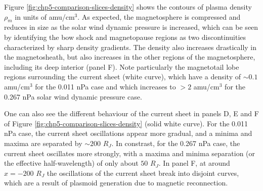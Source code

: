Figure \ref{fig:chp5-comparison-slices-density} shows the contours of plasma density $\rho_m$ in units of amu/cm$^3$. As expected, the magnetosphere is compressed and reduces in size as the solar wind dynamic pressure is increased, which can be seen by identifying the bow shock and magnetopause regions as two discontinuities characterized by sharp density gradients. The density also increases drastically in the magnetosheath, but also increases in the other regions of the magnetosphere, including its deep interior (panel F). Note particularly the magnetotail lobe regions surrounding the current sheet (white curve), which have a density of $\sim0.1$ amu/cm$^3$ for the 0.011 nPa case and which increases to $>2$ amu/cm$^3$ for the 0.267 nPa solar wind dynamic pressure case. 

One can also see the different behaviour of the current sheet in panels D, E and F of Figure \ref{fig:chp5-comparison-slices-density} (solid white curve). For the 0.011 nPa case, the current sheet oscillations appear more gradual, and a minima and maxima are separated by $\sim200$ $R_J$. In constrast, for the 0.267 nPa case, the current sheet oscillates more strongly, with a maxima and minima separation (or the effective half-wavelength) of only about $50$ $R_J$. In panel F, at around $x=-200$ $R_J$ the oscillations of the current sheet break into disjoint curves, which are a result of plasmoid generation due to magnetic reconnection.  

